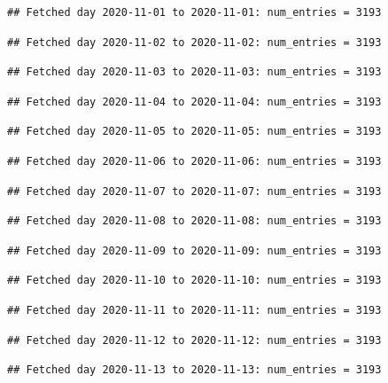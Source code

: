 \documentclass[]{article}
\begin{document}
\begin{verbatim}
## Fetched day 2020-11-01 to 2020-11-01: num_entries = 3193
\end{verbatim}

\begin{verbatim}
## Fetched day 2020-11-02 to 2020-11-02: num_entries = 3193
\end{verbatim}

\begin{verbatim}
## Fetched day 2020-11-03 to 2020-11-03: num_entries = 3193
\end{verbatim}

\begin{verbatim}
## Fetched day 2020-11-04 to 2020-11-04: num_entries = 3193
\end{verbatim}

\begin{verbatim}
## Fetched day 2020-11-05 to 2020-11-05: num_entries = 3193
\end{verbatim}

\begin{verbatim}
## Fetched day 2020-11-06 to 2020-11-06: num_entries = 3193
\end{verbatim}

\begin{verbatim}
## Fetched day 2020-11-07 to 2020-11-07: num_entries = 3193
\end{verbatim}

\begin{verbatim}
## Fetched day 2020-11-08 to 2020-11-08: num_entries = 3193
\end{verbatim}

\begin{verbatim}
## Fetched day 2020-11-09 to 2020-11-09: num_entries = 3193
\end{verbatim}

\begin{verbatim}
## Fetched day 2020-11-10 to 2020-11-10: num_entries = 3193
\end{verbatim}

\begin{verbatim}
## Fetched day 2020-11-11 to 2020-11-11: num_entries = 3193
\end{verbatim}

\begin{verbatim}
## Fetched day 2020-11-12 to 2020-11-12: num_entries = 3193
\end{verbatim}

\begin{verbatim}
## Fetched day 2020-11-13 to 2020-11-13: num_entries = 3193
\end{verbatim}
\end{document}

